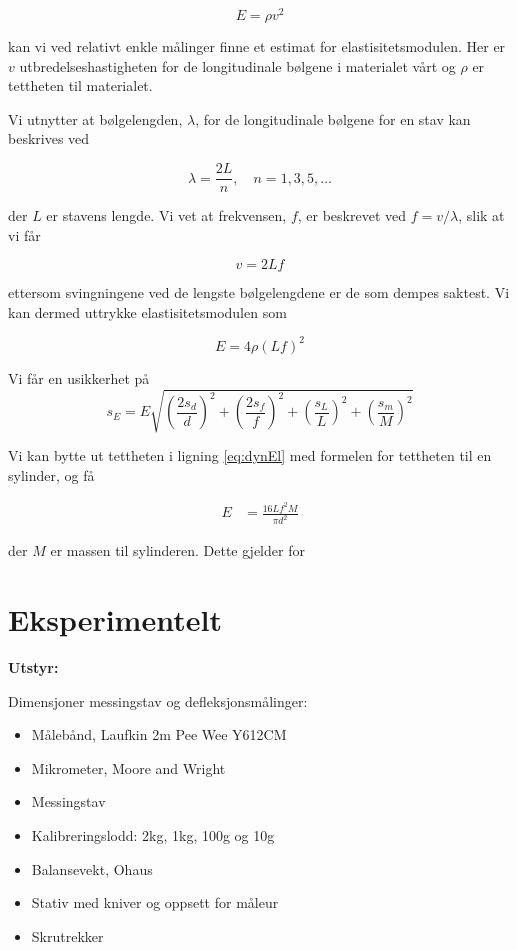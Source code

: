 \documentclass[a4paper,11pt, twocolumn]{article}
\begin{document}
\begin{equation}
	E = \rho v^2
	\label{eq:dynamiskElastisitet}
\end{equation}

kan vi ved relativt enkle målinger finne et estimat for elastisitetsmodulen. Her er $v$ utbredelseshastigheten for de longitudinale bølgene i materialet vårt og $\rho$ er tettheten til materialet.

Vi utnytter at bølgelengden, $\lambda$, for de longitudinale bølgene for en stav kan beskrives ved 

\begin{equation}
	\lambda = \frac{2L}{n}, \quad n = 1, 3, 5, \dots
\end{equation}

der $L$ er stavens lengde. Vi vet at frekvensen, $f$, er beskrevet ved $f = v/\lambda$, slik at vi får 

\begin{equation}
	v = 2Lf
\end{equation}

ettersom svingningene ved de lengste bølgelengdene er de som dempes saktest. Vi kan dermed uttrykke elastisitetsmodulen som

\begin{equation}
	E = 4\rho(Lf)^2
	\label{eq:dynEl}
\end{equation}

Vi får en usikkerhet på
\begin{equation}
	s_E = E\sqrt{\left(\frac{2s_d}{d}\right)^2+\left(\frac{2s_f}{f}\right)^2+\left(\frac{s_L}{L}\right)^2+\left(\frac{s_m}{M}\right)^2}	
	\label{eq:feilDynamisk}
\end{equation}

Vi kan bytte ut tettheten i ligning \eqref{eq:dynEl} med formelen for tettheten til en sylinder, og få

\begin{align}
	E &= \frac{16Lf^2M}{\pi d^2}
\end{align}

der $M$ er massen til sylinderen. Dette gjelder for  

\section{Eksperimentelt}
{\bf Utstyr:}

Dimensjoner messingstav og defleksjonsmålinger:
\begin{itemize}
	\item Målebånd, Laufkin 2m Pee Wee Y612CM
	\item Mikrometer, Moore and Wright
	\item Messingstav
	\item Kalibreringslodd: 2kg, 1kg, 100g og 10g
	\item Balansevekt, Ohaus
	\item Stativ med kniver og oppsett for måleur
	\item Skrutrekker
\end{itemize}
\end{document}
